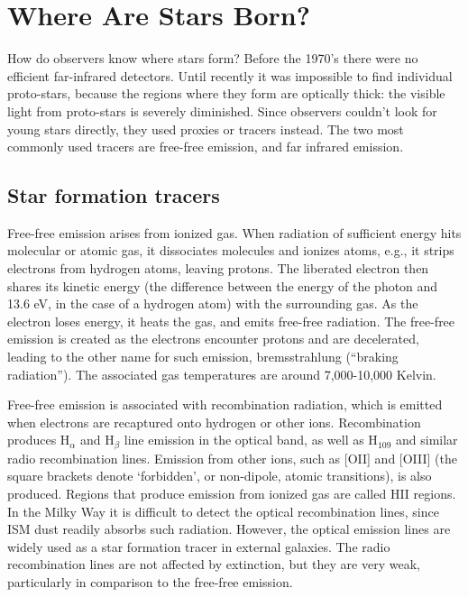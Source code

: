 \documentclass[../dissertation.tex]{subfiles}
\begin{document}
\section{Where Are Stars Born?}
How do observers know where stars form?
Before the 1970's there were no efficient far-infrared detectors. 
Until recently it was impossible to find individual proto-stars, because the regions where they form are optically thick: the visible light from proto-stars is severely diminished.
Since observers couldn't look for young stars directly, they used proxies or tracers instead. 
The two most commonly used tracers are free-free emission, and far infrared emission.

\subsection{Star formation tracers}

Free-free emission arises from ionized gas. When radiation of sufficient energy hits molecular or atomic gas, it dissociates molecules and ionizes atoms, e.g.,  it strips electrons from hydrogen atoms, leaving protons.
The liberated electron then shares its kinetic energy (the difference between the energy of the photon and 13.6 eV, in the case of a hydrogen atom) with the surrounding gas. 
As the electron loses energy, it heats the gas, and emits free-free radiation.
The free-free emission is created as the electrons encounter protons and are decelerated, leading to the other name for such emission, bremsstrahlung (``braking radiation''). 
The associated gas temperatures are around 7,000-10,000 Kelvin. 

Free-free emission is associated with recombination radiation, which is emitted when electrons are recaptured onto hydrogen or other ions. Recombination produces
H$_\alpha$ and H$_\beta$ line emission in the optical band, as well as H$_{109}$ and similar radio recombination lines. 
Emission from other ions, such as [OII] and [OIII] (the square brackets denote `forbidden', or non-dipole, atomic transitions), is also produced. Regions that produce emission from ionized gas are called HII regions. In the Milky Way it is difficult to detect the optical recombination lines, since ISM dust readily absorbs such radiation. However, the optical emission lines are widely used as a star formation tracer in external galaxies. The radio recombination lines are not affected by extinction, but they are very weak, particularly in comparison to the free-free emission. 
\end{document}
